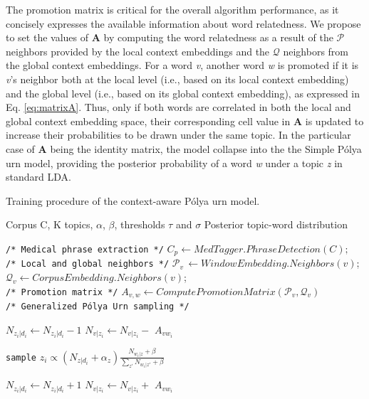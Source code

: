 \documentclass[letterpaper]{article}
\begin{document}
The promotion matrix is critical for the overall algorithm performance, as it concisely expresses the available information about word relatedness. We propose to set the values of $\mathbf{A}$ by computing the word relatedness as a result of the $\mathcal{P}$ neighbors provided by the local context embeddings and the $\mathcal{Q}$ neighbors from the global context embeddings.
For a word \textit{v}, another word \textit{w} is promoted if it is \textit{v}'s neighbor both at the local level (i.e., based on its local context embedding) and the global level (i.e., based on its global context embedding), as expressed in Eq. \ref{eq:matrixA}. Thus, only if both words are correlated in both the local and global context embedding space, their corresponding cell value in $\mathbf{A}$ is updated to increase their probabilities to be drawn under the same topic.
In the particular case of $\mathbf{A}$ being the identity matrix, the model collapse into the the Simple P\'{o}lya urn model, providing the posterior probability of a word \textit{w} under a topic \textit{z} in standard LDA.

\begin{algorithm}[htb]
\begin{algorithmic}[1]
\caption{Training procedure of the context-aware P\'{o}lya urn model.}
\label{alg:polyaurn_model}
\Require Corpus C, K topics, $\alpha$, $\beta$, thresholds $\tau$ and $\sigma$
\Ensure Posterior topic-word distribution

\State \texttt{/* Medical phrase extraction */}
\State $C_p \leftarrow MedTagger.PhraseDetection(C);$ \\

\State  \texttt{/* Local and global neighbors */}
\State $\mathcal{P}_{v}\, \leftarrow  WindowEmbedding.Neighbors(v)$;
\State $\mathcal{Q}_{v} \leftarrow  CorpusEmbedding.Neighbors(v)$;
\EndFor \\

\State \texttt{/* Promotion matrix */}
\State $\mathit{A_{v,w}} \leftarrow ComputePromotionMatrix(\mathcal{P}_{v}, \mathcal{Q}_{v})$ \\

\State \texttt{/* Generalized P\'{o}lya Urn sampling */}

\State $N_{z_i|d_i} \leftarrow N_{z_i|d_i} - 1 $
\State $N_{v|z_i} \leftarrow N_{v|z_i} -$ \textbf{\textit{$A_{vw_{i}}$}}
\EndFor
\EndFor

\State \texttt{sample} $z_i \propto (N_{z|d_i} + \alpha_z) \frac{N_{w_i|z} + \beta}{\sum_{z'}^{} N_{w_i|z'} + \beta}$

\State $N_{z_i|d_i} \leftarrow N_{z_i|d_i} + 1 $
\State $N_{v|z_i} \leftarrow N_{v|z_i} +$ \textbf{\textit{$A_{vw_{i}}$}}  %
\EndFor
\EndFor
\EndFor

\end{algorithmic}
\end{algorithm}
\end{document}
